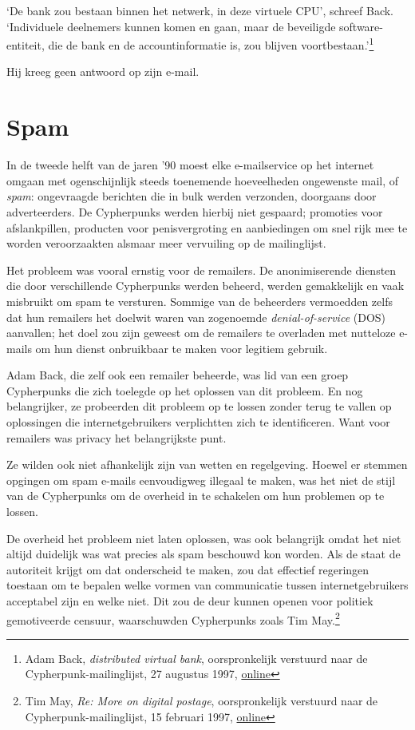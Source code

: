 \documentclass[
  a5paper,
  smalldemyvopaper,11pt,twoside,onecolumn,openright,extrafontsizes,
hidelinks]{memoir}
\begin{document}
`De bank zou bestaan binnen het netwerk, in deze virtuele CPU', schreef
Back. `Individuele deelnemers kunnen komen en gaan, maar de beveiligde
software-entiteit, die de bank en de accountinformatie is, zou blijven
voortbestaan.'\footnote{Adam Back, \emph{distributed virtual bank},
  oorspronkelijk verstuurd naar de Cypherpunk-mailinglijst, 27 augustus
  1997,
  \href{https://cypherpunks.venona.com/date/1997/08/msg01289.html}{online}}

Hij kreeg geen antwoord op zijn e-mail.

\section{Spam}\label{spam}

In de tweede helft van de jaren '90 moest elke e-mailservice op het
internet omgaan met ogenschijnlijk steeds toenemende hoeveelheden
ongewenste mail, of \emph{spam}: ongevraagde berichten die in bulk
werden verzonden, doorgaans door adverteerders. De Cypherpunks werden
hierbij niet gespaard; promoties voor afslankpillen, producten voor
penisvergroting en aanbiedingen om snel rijk mee te worden veroorzaakten
alsmaar meer vervuiling op de mailinglijst.

Het probleem was vooral ernstig voor de remailers. De anonimiserende
diensten die door verschillende Cypherpunks werden beheerd, werden
gemakkelijk en vaak misbruikt om spam te versturen. Sommige van de
beheerders vermoedden zelfs dat hun remailers het doelwit waren van
zogenoemde \emph{denial-of-service} (DOS) aanvallen; het doel zou zijn
geweest om de remailers te overladen met nutteloze e-mails om hun dienst
onbruikbaar te maken voor legitiem gebruik.

Adam Back, die zelf ook een remailer beheerde, was lid van een groep
Cypherpunks die zich toelegde op het oplossen van dit probleem. En nog
belangrijker, ze probeerden dit probleem op te lossen zonder terug te
vallen op oplossingen die internetgebruikers verplichtten zich te
identificeren. Want voor remailers was privacy het belangrijkste punt.

Ze wilden ook niet afhankelijk zijn van wetten en regelgeving. Hoewel er
stemmen opgingen om spam e-mails eenvoudigweg illegaal te maken, was het
niet de stijl van de Cypherpunks om de overheid in te schakelen om hun
problemen op te lossen.

De overheid het probleem niet laten oplossen, was ook belangrijk omdat
het niet altijd duidelijk was wat precies als spam beschouwd kon worden.
Als de staat de autoriteit krijgt om dat onderscheid te maken, zou dat
effectief regeringen toestaan om te bepalen welke vormen van
communicatie tussen internetgebruikers acceptabel zijn en welke niet.
Dit zou de deur kunnen openen voor politiek gemotiveerde censuur,
waarschuwden Cypherpunks zoals Tim May.\footnote{Tim May, \emph{Re: More
  on digital postage}, oorspronkelijk verstuurd naar de
  Cypherpunk-mailinglijst, 15 februari 1997,
  \href{https://cypherpunks.venona.com/date/1997/02/msg02295.h}{online}}
\end{document}
